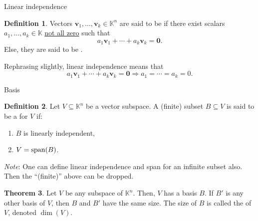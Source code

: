 \documentclass[dvipsnames]{beamer}
\theoremstyle{definition}
\newtheorem{thm}{Theorem}
\newtheorem{defn}[thm]{Definition}
\let\subset\subseteq
\begin{document}
\begin{frame}{Linear independence}
    \begin{defn}
        Vectors $\mathbf{v}_{1}, \ldots, \mathbf{v}_{k} \in \mathbb{K}^{n}$ are said to be  \pause if there exist scalars $a_{1}, \ldots, a_{k} \in \mathbb{K}$ \underline{not all zero} such that
        \begin{equation*} 
            a_{1} \mathbf{v}_{1} + \cdots + a_{k} \mathbf{v}_{k} = \mathbf{0}.
        \end{equation*} \pause
        Else, they are said to be .
    \end{defn} \pause

    Rephrasing slightly, linear independence means that
    \begin{equation*} 
        a_{1} \mathbf{v}_{1} + \cdots + a_{k} \mathbf{v}_{k} = \mathbf{0} \Rightarrow a_{1} = \cdots = a_{k} = 0.
    \end{equation*} 
\end{frame}
\begin{frame}{Basis}
    \begin{defn}
        Let $V \subset \mathbb{K}^{n}$ be a vector subspace. \pause A (finite) subset $B \subset V$ is said to be a  for $V$ if: \pause
        \begin{enumerate}[<+->]
            \item $B$ is linearly independent,
            \item $V = \operatorname{span}(B)$.
        \end{enumerate}
    \end{defn} \pause
    \emph{Note}: One can define linear independence and span for an infinite subset also. Then the ``(finite)'' above can be dropped. \pause

    \begin{thm}
        Let $V$ be any subspace of $\mathbb{K}^{n}$. \pause \newline
        Then, $V$ has a basis $B$. \pause If $B'$ is any other basis of $V$, then $B$ and $B'$ have the same size. \pause \newline
        The size of $B$ is called the  of $V$, denoted $\dim(V)$.
    \end{thm}
\end{frame}
\end{document}
